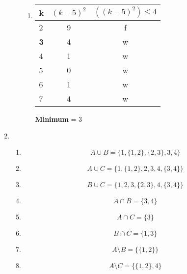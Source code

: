 \documentclass[a4paper]{article}
\begin{document}
\begin{enumerate}
\begin{enumerate}
\begin{enumerate}
				\item
				\begin{center}
					\begin{tabular}{|l|c|c|}
						\firsthline
							k & $(k - 5)^{2}$ & $((k - 5)^{2}) \leq 4$ \\
						\hline
							2 & 9 & f \\
							\textbf{3} & 4 & w \\
							4 & 1 & w \\
							5 & 0 & w \\
							6 & 1 & w \\
							7 & 4 & w \\
						\hline
					\end{tabular}
					\newline
					\textbf{Minimum} = 3
				\end{center}
			\end{enumerate}
		\end{enumerate}
		
		\item
		\begin{enumerate}
			\item
			\begin{equation*}
				A \cup B = \{1, \{1, 2\}, \{2, 3\}, 3, 4\}
			\end{equation*}
			\item
			\begin{equation*}
				A \cup C = \{1, \{1, 2\}, 2, 3, 4, \{3, 4\}\}
			\end{equation*}
			\item
			\begin{equation*}
				B \cup C = \{1, 2, 3, \{2, 3\}, 4, \{3, 4\}\}
			\end{equation*}
			
			\item
			\begin{equation*}
				A \cap B = \{3, 4\}
			\end{equation*}
			\item
			\begin{equation*}
				A \cap C = \{3\}
			\end{equation*}
			\item
			\begin{equation*}
				B \cap C = \{1, 3\}
			\end{equation*}
			
			\item
			\begin{equation*}
				A \text{\textbackslash} B = \{\{1, 2\}\}
			\end{equation*}
			\item
			\begin{equation*}
				A \text{\textbackslash} C = \{\{1, 2\}, 4\}
			\end{equation*}
			

\end{enumerate}
\end{enumerate}
\end{document}
